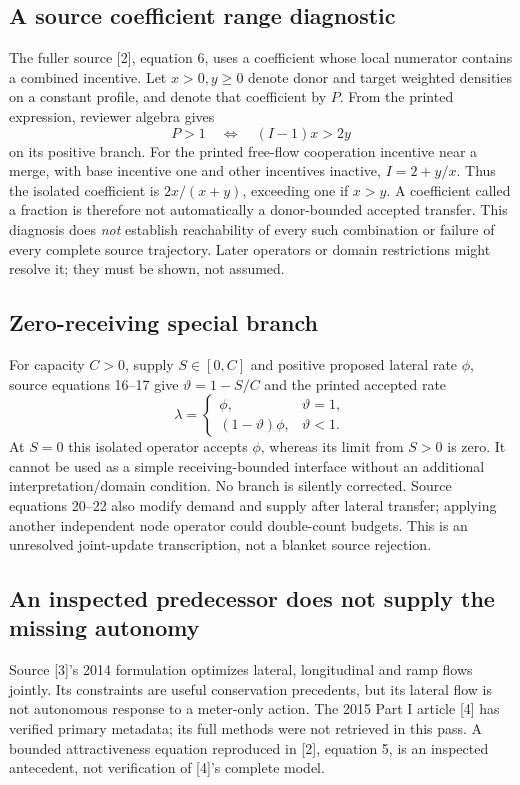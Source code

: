 \documentclass[10pt,a4paper]{article}
\begin{document}
\subsection*{A source coefficient range diagnostic}
The fuller source [2], equation 6, uses a coefficient whose local numerator
contains a combined incentive. Let $x>0,y\geq0$ denote donor and target
weighted densities on a constant profile, and denote that coefficient by $P$.
From the printed expression, reviewer algebra gives
\begin{equation}
 P>1\quad\Longleftrightarrow\quad (I-1)x>2y
\end{equation}
on its positive branch. For the printed free-flow cooperation incentive near
a merge, with base incentive one and other incentives inactive, $I=2+y/x$.
Thus the isolated coefficient is $2x/(x+y)$, exceeding one if $x>y$.
A coefficient called a fraction is therefore not automatically a donor-bounded
accepted transfer. This diagnosis does \emph{not} establish reachability of every
such combination or failure of every complete source trajectory. Later operators
or domain restrictions might resolve it; they must be shown, not assumed.

\subsection*{Zero-receiving special branch}
For capacity $C>0$, supply $S\in[0,C]$ and positive proposed lateral rate $\phi$,
source equations 16--17 give $\vartheta=1-S/C$ and the printed accepted rate
\begin{equation}
 \lambda=\begin{cases}\phi,&\vartheta=1,\\
 (1-\vartheta)\phi,&\vartheta<1.\end{cases}
\end{equation}
At $S=0$ this isolated operator accepts $\phi$, whereas its limit from $S>0$
is zero. It cannot be used as a simple receiving-bounded interface without
an additional interpretation/domain condition. No branch is silently corrected.
Source equations 20--22 also modify demand and supply after lateral transfer;
applying another independent node operator could double-count budgets.
This is an unresolved joint-update transcription, not a blanket source rejection.

\subsection*{An inspected predecessor does not supply the missing autonomy}
Source [3]'s 2014 formulation optimizes lateral, longitudinal and ramp flows
jointly. Its constraints are useful conservation precedents, but its lateral
flow is not autonomous response to a meter-only action. The 2015 Part I article
[4] has verified primary metadata; its full methods were not retrieved in this
pass. A bounded attractiveness equation reproduced in [2], equation 5, is an
inspected antecedent, not verification of [4]'s complete model.
\end{document}
